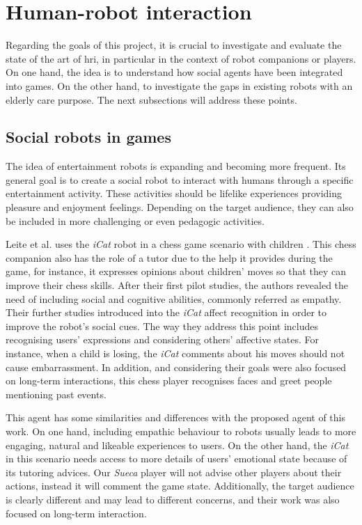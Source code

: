 \section{Human-robot interaction}

Regarding the goals of this project, it is crucial to investigate and evaluate the state of the art of \ac{hri}, in particular in the context of robot companions or players.
On one hand, the idea is to understand how social agents have been integrated into games.
On the other hand, to investigate the gaps in existing robots with an elderly care purpose.
The next subsections will address these points.


\subsection{Social robots in games}

The idea of entertainment robots is expanding and becoming more frequent.
Its general goal is to create a social robot to interact with humans through a specific entertainment activity.
These activities should be lifelike experiences providing pleasure and enjoyment feelings.
Depending on the target audience, they can also be included in more challenging or even pedagogic activities.

Leite et al. uses the \emph{iCat} robot in a chess game scenario with children \cite{Castellano2010,Leite,Leitea}.
This chess companion also has the role of a tutor due to the help it provides during the game, for instance, it expresses opinions about children' moves so that they can improve their chess skills.
After their first pilot studies, the authors revealed the need of including social and cognitive abilities, commonly referred as empathy.
Their further studies introduced into the \emph{iCat} affect recognition in order to improve the robot's social cues.
The way they address this point includes recognising users' expressions and considering others' affective states.
For instance, when a child is losing, the \emph{iCat} comments about his moves should not cause embarrassment.
In addition, and considering their goals were also focused on long-term interactions, this chess player recognises faces and greet people mentioning past events.

This agent has some similarities and differences with the proposed agent of this work.
On one hand, including empathic behaviour to robots usually leads to more engaging, natural and likeable experiences to users.
On the other hand, the \emph{iCat} in this scenario needs access to more details of users' emotional state because of its tutoring advices. Our \emph{Sueca} player will not advise other players about their actions, instead it will comment the game state.
Additionally, the target audience is clearly different and may lead to different concerns, and their work was also focused on long-term interaction.


